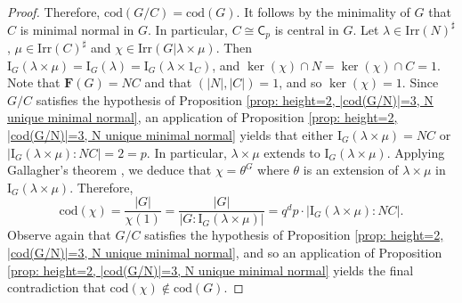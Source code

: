 \documentclass[9pt]{article}
\begin{document}
\begin{proof}
	Therefore, $\mathrm{cod}(G/C)=\mathrm{cod}(G)$.
	It follows by the minimality of $G$ that $C$ is minimal normal in $G$.
    In particular, $C\cong \mathsf{C}_{p}$ is central in $G$.
	Let $\lambda \in \mathrm{Irr}(N)^\sharp$, $\mu\in \mathrm{Irr}(C)^\sharp$ and $\chi \in \mathrm{Irr}(G|\lambda\times \mu)$.
	Then $\mathrm{I}_{G}(\lambda\times \mu)=\mathrm{I}_{G}(\lambda)=\mathrm{I}_{G}(\lambda\times 1_C)$, and $\ker(\chi)\cap N=\ker(\chi)\cap C=1$.
	Note that $\mathbf{F}(G)=NC$ and that $(|N|,|C|)=1$, and so $\ker(\chi)=1$.
	Since $G/C$ satisfies the hypothesis of Proposition \ref{prop: height=2, |cod(G/N)|=3, N unique minimal normal},
	an application of Proposition \ref{prop: height=2, |cod(G/N)|=3, N unique minimal normal} yields that
	either $\mathrm{I}_{G}(\lambda\times \mu)=NC$ or $|\mathrm{I}_{G}(\lambda\times \mu):NC|=2=p$.
    In particular, $\lambda\times \mu$ extends to $\mathrm{I}_{G}(\lambda\times \mu)$.
	Applying Gallagher's theorem \cite[Corollary 6.17]{isaacs1994}, we deduce that $\chi=\theta^G$ where $\theta$ is an extension of $\lambda\times \mu$ in $\mathrm{I}_{G}(\lambda\times \mu)$.
	Therefore,
	\[
	\mathrm{cod}(\chi)=\frac{|G|}{\chi(1)}=\frac{|G|}{|G:\mathrm{I}_{G}(\lambda\times \mu)|}=q^{d}p\cdot |\mathrm{I}_{G}(\lambda\times \mu):NC|.
	\]
   Observe again that $G/C$ satisfies the hypothesis of Proposition \ref{prop: height=2, |cod(G/N)|=3, N unique minimal normal},
   and so an application of Proposition \ref{prop: height=2, |cod(G/N)|=3, N unique minimal normal}
   yields the final contradiction that $\mathrm{cod}(\chi)\notin \mathrm{cod}(G)$.	
\end{proof}
\end{document}
